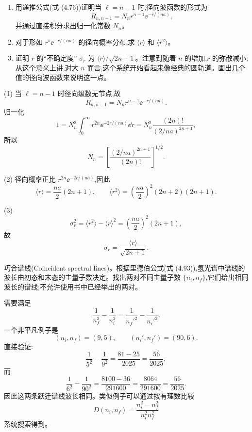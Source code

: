 \begin{question}
\begin{enumerate}
\item 用递推公式(式 (4.76))证明当 $\ell=n-1$ 时,径向波函数的形式为
\[
R_{n,n-1}=N_n r^{n-1}\ee^{-r/(na)},
\]
并通过直接积分求出归一化常数 $N_n$。
\item 对于形如 $r^s \ee^{-r/(na)}$ 的径向概率分布,求 $\langle r\rangle$ 和 $\langle r^2\rangle$。
\item 证明 $r$ 的“不确定度” $\sigma_r$ 为 $\langle r\rangle/\sqrt{2n+1}$。注意到随着 $n$ 的增加,$r$ 的弥散减小;从这个意义上讲,对大 $n$ 而言,这个系统开始看起来像经典的圆轨道。画出几个值的径向波函数来说明这一点。
\end{enumerate}

\par\smallskip
{}

\end{question}
\begin{solution}

(1) 当 $\ell=n-1$ 时径向级数无节点,故
\[
R_{n,n-1}=N_nr^{n-1}\ee^{-r/(na)}.
\]
归一化
\[
1=N_n^2\int_0^\infty r^{2n}\ee^{-2r/(na)}\dd r
=N_n^2\frac{(2n)!}{(2/na)^{2n+1}},
\]
所以
\[
N_n=\left[\frac{(2/na)^{2n+1}}{(2n)!}\right]^{1/2}.
\]

(2) 径向概率正比 $r^{2n}\ee^{-2r/(na)}$,因此
\[
\langle r\rangle=\frac{na}{2}(2n+1),
\qquad
\langle r^2\rangle=\left(\frac{na}{2}\right)^2(2n+2)(2n+1).
\]

(3) 
\[
\sigma_r^2=\langle r^2\rangle-\langle r\rangle^2=\left(\frac{na}{2}\right)^2(2n+1),
\]
故
\[
\sigma_r=\frac{\langle r\rangle}{\sqrt{2n+1}}.
\]

\end{solution}

\begin{question}
巧合谱线(Coincident spectral lines)。根据里德伯公式(式 (4.93)),氢光谱中谱线的波长由初态和末态的主量子数决定。找出两对不同主量子数 $\{n_i,n_f\}$,它们给出相同波长的谱线;不允许使用书中已经举出的两对。

\par\smallskip
{}

\end{question}
\begin{solution}


需要满足
\[
\frac1{n_f^2}-\frac1{n_i^2}=\frac1{{n_f'}^2}-\frac1{{n_i'}^2}.
\]
一个非平凡例子是
\[
(n_i,n_f)=(9,5),\qquad (n_i',n_f')=(90,6).
\]
直接验证:
\[
\frac1{5^2}-\frac1{9^2}=\frac{81-25}{2025}=\frac{56}{2025},
\]
而
\[
\frac1{6^2}-\frac1{90^2}=\frac{8100-36}{291600}=\frac{8064}{291600}=\frac{56}{2025}.
\]
因此这两条跃迁谱线波长相同。类似例子可以通过按有理数比较
\[
D(n_i,n_f)=\frac{n_i^2-n_f^2}{n_i^2n_f^2}
\]
系统搜索得到。


\end{solution}

